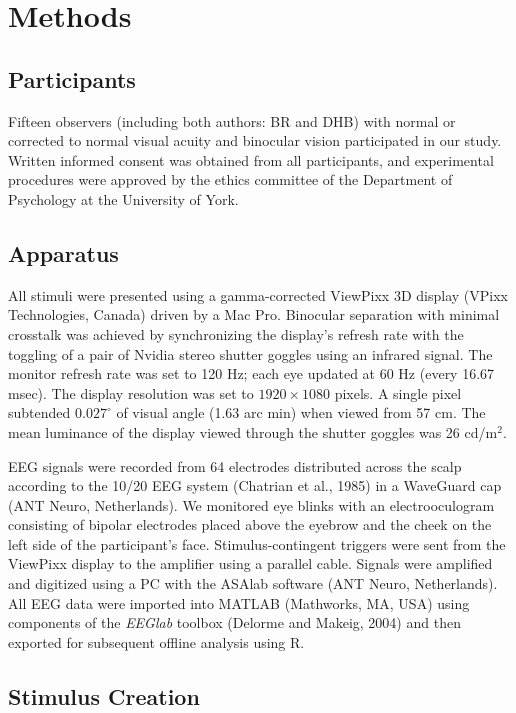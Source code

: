 \documentclass[
  12pt,
]{article}
\begin{document}
\section{Methods}\label{methods}

\subsection{Participants}\label{participants}

Fifteen observers (including both authors: BR and DHB) with normal or
corrected to normal visual acuity and binocular vision participated in
our study. Written informed consent was obtained from all participants,
and experimental procedures were approved by the ethics committee of the
Department of Psychology at the University of York.

\subsection{Apparatus}\label{apparatus}

All stimuli were presented using a gamma-corrected ViewPixx 3D display
(VPixx Technologies, Canada) driven by a Mac Pro. Binocular separation
with minimal crosstalk was achieved by synchronizing the display's
refresh rate with the toggling of a pair of Nvidia stereo shutter
goggles using an infrared signal. The monitor refresh rate was set to
120 Hz; each eye updated at 60 Hz (every 16.67 msec). The display
resolution was set to \(1920 \times 1080\) pixels. A single pixel
subtended \(0.027^\circ\) of visual angle (1.63 arc min) when viewed
from 57 cm. The mean luminance of the display viewed through the shutter
goggles was 26 cd/m\(^2\).

EEG signals were recorded from 64 electrodes distributed across the
scalp according to the 10/20 EEG system (Chatrian et al., 1985) in a
WaveGuard cap (ANT Neuro, Netherlands). We monitored eye blinks with an
electrooculogram consisting of bipolar electrodes placed above the
eyebrow and the cheek on the left side of the participant's face.
Stimulus-contingent triggers were sent from the ViewPixx display to the
amplifier using a parallel cable. Signals were amplified and digitized
using a PC with the ASAlab software (ANT Neuro, Netherlands). All EEG
data were imported into MATLAB (Mathworks, MA, USA) using components of
the \textit{EEGlab} toolbox (Delorme and Makeig, 2004) and then exported
for subsequent offline analysis using R.

\subsection{Stimulus Creation}\label{stimulus-creation}
\end{document}
